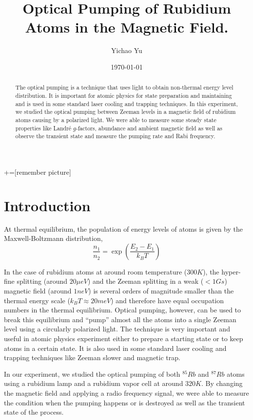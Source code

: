 \documentclass[aps,twocolumn,secnumarabic,balancelastpage,amsmath,amssymb,nofootinbib]{revtex4}
\newcommand{\paren}[1]{{\left({#1}\right)}}
\begin{document}
+=[remember picture]
\title{Optical Pumping of Rubidium Atoms in the Magnetic Field.}
\author{Yichao Yu}
\date{\today}

\begin{abstract}
  The optical pumping is a technique that uses light to obtain non-thermal energy level distribution. It is important for atomic physics for state preparation and maintaining and is used in some standard laser cooling and trapping techniques. In this experiment, we studied the optical pumping between Zeeman levels in a magnetic field of rubidium atoms causing by a polarized light. We were able to measure some steady state properties like Landr\'e $g$-factors, abundance and ambient magnetic field as well as observe the transient state and measure the pumping rate and Rabi frequency.
\end{abstract}

\maketitle
\section*{Introduction}
At thermal equilibrium, the population of energy levels of atoms is given by the Maxwell-Boltzmann distribution,
\[ \frac{n_1}{n_2}=\exp\paren{\frac{E_2-E_1}{k_BT}} \]

In the case of rubidium atoms at around room temperature ($300K$), the hyper-fine splitting (around $20\mu eV$) and the Zeeman splitting in a weak ($<1Gs$) magnetic field (around $1neV$) is several orders of magnitude smaller than the thermal energy scale ($k_BT\approx20meV$) and therefore have equal occupation numbers in the thermal equilibrium. Optical pumping, however, can be used to break this equilibrium and ``pump'' almost all the atoms into a single Zeeman level using a circularly polarized light. The technique is very important and useful in atomic physics experiment either to prepare a starting state or to keep atoms in a certain state. It is also used in some standard laser cooling and trapping techniques like Zeeman slower and magnetic trap.

In our experiment, we studied the optical pumping of both ${}^{85}Rb$ and ${}^{87}Rb$ atoms using a rubidium lamp and a rubidium vapor cell at around $320K$. By changing the magnetic field and applying a radio frequency signal, we were able to measure the condition when the pumping happens or is destroyed as well as the transient state of the process.
\end{document}
